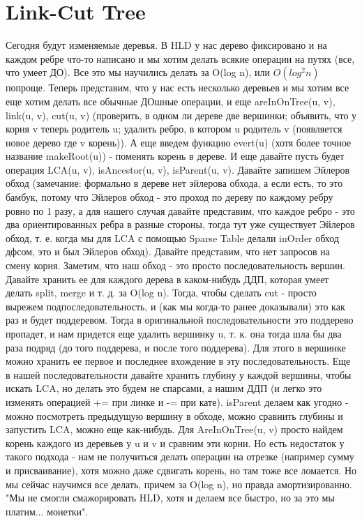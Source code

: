 \section{Link-Cut Tree}




Сегодня будут изменяемые деревья. В HLD у нас дерево фиксировано и на каждом ребре что-то написано и мы хотим делать всякие операции на путях (все, что умеет ДО). Все это мы научились делать за O(log n), или $O(log^2 n)$ попроще. Теперь представим, что у нас есть несколько деревьев и мы хотим все еще хотим делать все обычные ДОшные операции, и еще areInOnTree(u, v), link(u, v), cut(u, v) (проверить, в одном ли дереве две вершинки; объявить, что у корня v теперь родитель u; удалить ребро, в котором u родитель v (появляется новое дерево где v корень)). А еще введем функцию evert(u) (хотя более точное название makeRoot(u)) - поменять корень в дереве. И еще давайте пусть будет операция LCA(u, v), isAncestor(u, v), isParent(u, v). Давайте запишем Эйлеров обход (замечание: формально в дереве нет эйлерова обхода, а если есть, то это бамбук, потому что Эйлеров обход - это проход по дереву по каждому ребру ровно по 1 разу, а для нашего случая давайте представим, что каждое ребро - это два ориентированных ребра в разные стороны, тогда тут уже существует Эйлеров обход, т. е. когда мы для LCA с помощью Sparse Table делали inOrder обход дфсом, это и был Эйлеров обход). Давайте представим, что нет запросов на смену корня. Заметим, что наш обход - это просто последовательность вершин. Давайте хранить ее для каждого дерева в каком-нибудь ДДП, которая умеет делать split, merge и т. д. за O(log n). Тогда, чтобы сделать cut - просто вырежем подпоследовательность, и (как мы когда-то ранее доказывали) это как раз и будет поддеревом. Тогда в оригинальной последовательности это поддерево пропадет, и нам придется еще удалить вершинку u, т. к. она тогда шла бы два раза подряд (до того поддерева, и после того поддерева). Для этого в вершинке можно хранить ее первое и последнее вхождение в эту последовательность. Еще в нашей последовательности давайте хранить глубину у каждой вершины, чтобы искать LCA, но делать это будем не спарсами, а нашим ДДП (и легко это изменять операцией += при линке и -= при кате). isParent делаем как угодно - можно посмотреть предыдущую вершину в обходе, можно сравнить глубины и запустить LCA, можно еще как-нибудь. Для AreInOnTree(u, v) просто найдем корень каждого из деревьев у u и v и сравним эти корни. Но есть недостаток у такого подхода - нам не получиться делать операции на отрезке (например сумму и присваивание), хотя можно даже сдвигать корень, но там тоже все ломается. Но мы сейчас научимся все делать, причем за O(log n), но правда амортизированно. "Мы не смогли смажорировать HLD, хотя и делаем все быстро, но за это мы платим... монетки".




